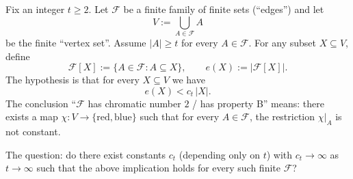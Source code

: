 Fix an integer $t\ge 2$. Let $\mathcal{F}$ be a finite family of finite sets (``edges'') and let
\[
V := \bigcup_{A\in\mathcal{F}} A
\]
be the finite ``vertex set''. Assume $|A|\ge t$ for every $A\in\mathcal{F}$. For any subset $X\subseteq V$, define
\[
\mathcal{F}[X] := \{A\in\mathcal{F}: A\subseteq X\},\qquad e(X):=|\mathcal{F}[X]|.
\]
The hypothesis is that for every $X\subseteq V$ we have
\[
 e(X) < c_t\,|X|.
\]
The conclusion ``$\mathcal{F}$ has chromatic number $2$ / has property B'' means: there exists a map
$\chi:V\to\{\text{red},\text{blue}\}$ such that for every $A\in\mathcal{F}$, the restriction $\chi|_A$ is not constant.

The question: do there exist constants $c_t$ (depending only on $t$) with $c_t\to\infty$ as $t\to\infty$ such that the above implication holds for every such finite $\mathcal{F}$?
